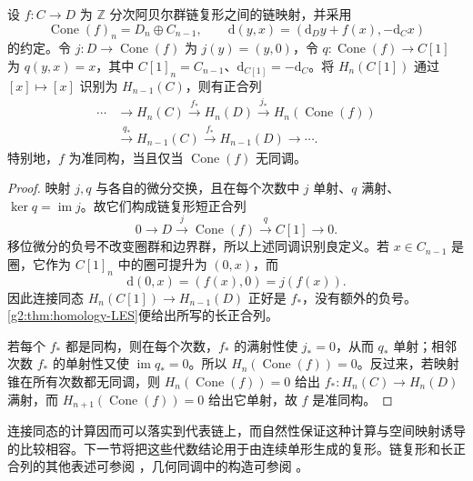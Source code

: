 \begin{corollary}\label{g2:cor:cone-LES}
	设 \(f:C\to D\) 为 \(\mathbb Z\) 分次阿贝尔群链复形之间的链映射，并采用
	\[
		\operatorname{Cone}(f)_n=D_n\oplus C_{n-1},\qquad
		\mathrm{d}(y,x)=(\mathrm{d}_Dy+f(x),-\mathrm{d}_Cx)
	\]
	的约定。令 \(j:D\to\operatorname{Cone}(f)\) 为 \(j(y)=(y,0)\)，令 \(q:\operatorname{Cone}(f)\to C[1]\) 为 \(q(y,x)=x\)，其中 \(C[1]_n=C_{n-1}\)、\(\mathrm{d}_{C[1]}=-\mathrm{d}_C\)。将 \(H_n(C[1])\) 通过 \([x]\mapsto[x]\) 识别为 \(H_{n-1}(C)\)，则有正合列
	\[
		\begin{aligned}
			\cdots&\longrightarrow H_n(C)\xrightarrow{f_*}H_n(D)
			\xrightarrow{j_*}H_n(\operatorname{Cone}(f))\\
			&\xrightarrow{q_*}H_{n-1}(C)\xrightarrow{f_*}H_{n-1}(D)
			\longrightarrow\cdots.
		\end{aligned}
	\]
	特别地，\(f\) 为准同构，当且仅当 \(\operatorname{Cone}(f)\) 无同调。
\end{corollary}
\begin{proof}
	映射 \(j,q\) 与各自的微分交换，且在每个次数中 \(j\) 单射、\(q\) 满射、\(\ker q=\operatorname{im}j\)。故它们构成链复形短正合列
	\[
		0\longrightarrow D\xrightarrow{j}\operatorname{Cone}(f)
		\xrightarrow{q}C[1]\longrightarrow0.
	\]
	移位微分的负号不改变圈群和边界群，所以上述同调识别良定义。若 \(x\in C_{n-1}\) 是圈，它作为 \(C[1]_n\) 中的圈可提升为 \((0,x)\)，而
	\[
		\mathrm{d}(0,x)=(f(x),0)=j(f(x)).
	\]
	因此连接同态 \(H_n(C[1])\to H_{n-1}(D)\) 正好是 \(f_*\)，没有额外的负号。\cref{g2:thm:homology-LES}便给出所写的长正合列。

	若每个 \(f_*\) 都是同构，则在每个次数，\(f_*\) 的满射性使 \(j_*=0\)，从而 \(q_*\) 单射；相邻次数 \(f_*\) 的单射性又使 \(\operatorname{im}q_*=0\)。所以 \(H_n(\operatorname{Cone}(f))=0\)。反过来，若映射锥在所有次数都无同调，则 \(H_n(\operatorname{Cone}(f))=0\) 给出 \(f_*:H_n(C)\to H_n(D)\) 满射，而 \(H_{n+1}(\operatorname{Cone}(f))=0\) 给出它单射，故 \(f\) 是准同构。
\end{proof}

连接同态的计算因而可以落实到代表链上，而自然性保证这种计算与空间映射诱导的比较相容。下一节将把这些代数结论用于由连续单形生成的复形。链复形和长正合列的其他表述可参阅 \cite[第12章]{May1999}，几何同调中的构造可参阅 \cite[第2.1节]{Hatcher2002}。
